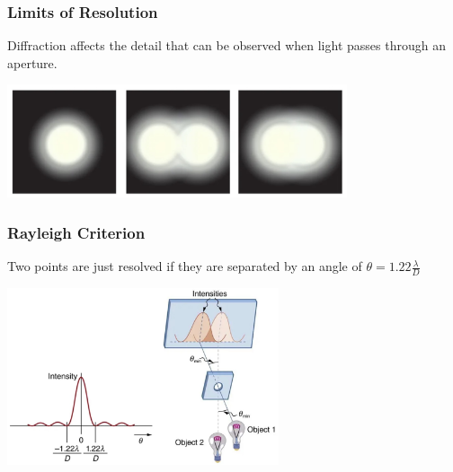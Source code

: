 \documentclass{beamer}
\begin{document}
\begin{frame}\frametitle{Limits of Resolution}

Diffraction affects the detail that can be observed when light passes through an aperture.

\vspace{0.5cm}

\begin{center}
\includegraphics[width=10cm]{fig/rayleigh1.jpg}
\end{center}

\end{frame}


\begin{frame}\frametitle{Rayleigh Criterion}


Two points are just resolved if they are separated by an angle of $\theta = 1.22 \frac{\lambda}{D}$

\vspace{0.25cm}

\begin{center}
\includegraphics[width=8cm]{fig/rayleigh2.jpg}
\end{center}
\end{frame}
\end{document}

